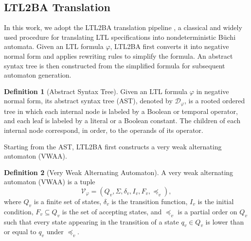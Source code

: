 \documentclass[lettersize,journal]{IEEEtran}
\theoremstyle{italiclemma}
\theoremstyle{italiclemma}
\theoremstyle{definition}
\newtheorem{definition}{Definition}
\begin{document}
\subsection{LTL2BA Translation}

In this work, we adopt the LTL2BA translation pipeline \cite{Gastin2001FastLT}, a classical and widely used procedure for translating LTL specifications into nondeterministic Büchi automata. Given an LTL formula $\varphi$, LTL2BA first converts it into negative normal form and applies rewriting rules to simplify the formula. An abstract syntax tree is then constructed from the simplified formula for subsequent automaton generation.


\begin{definition}[Abstract Syntax Tree\cite{Gastin2001FastLT,2006Compilers}] Given an LTL formula $\varphi$ in negative normal form, its abstract syntax tree (AST), denoted by $\mathcal{D}_\varphi$, is a rooted ordered tree in which each internal node is labeled by a Boolean or temporal operator, and each leaf is labeled by a literal or a Boolean constant. The children of each internal node correspond, in order, to the operands of its operator. \end{definition}

Starting from the AST, LTL2BA first constructs a very weak alternating automaton (VWAA). 

\begin{definition}[Very Weak Alternating Automaton]
A very weak alternating automaton (VWAA) is a tuple
\[
\mathcal{V}_\varphi=(Q_v,\Sigma,\delta_v,I_v,F_v,\preceq_v),
\]
where $Q_v$ is a finite set of states, $\delta_v$ is the transition function, $I_v$ is the initial condition, $F_v \subseteq Q_v$ is the set of accepting states, and $\preceq_v$ is a partial order on $Q_v$ such that every state appearing in the transition of a state $q_v \in Q_v$ is lower than or equal to $q_v$ under $\preceq_v$.
\end{definition}
\end{document}
